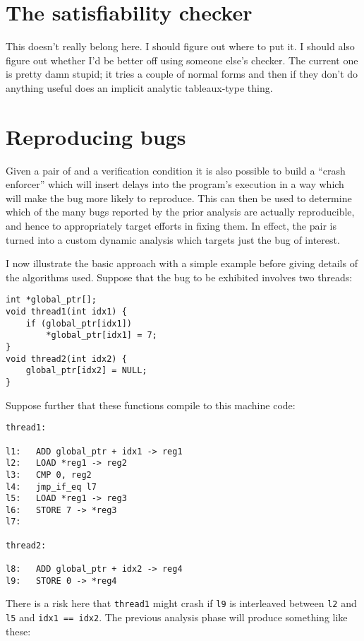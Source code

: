 \section{The satisfiability checker}
This doesn't really belong here.  I should figure out where to put it.
I should also figure out whether I'd be better off using someone
else's checker.  The current one is pretty damn stupid; it tries a
couple of normal forms and then if they don't do anything useful does
an implicit analytic tableaux-type thing.

\section{Reproducing bugs}
\label{sect:reproducing_bugs}

Given a pair of {\StateMachines} and a verification condition it is
also possible to build a ``crash enforcer'' which will insert delays
into the program's execution in a way which will make the bug more
likely to reproduce.  This can then be used to determine which of the
many bugs reported by the prior analysis are actually reproducible,
and hence to appropriately target efforts in fixing them.  In effect,
the {\StateMachine} pair is turned into a custom dynamic analysis
which targets just the bug of interest.

I now illustrate the basic approach with a simple example before
giving details of the algorithms used.  Suppose that the bug to be
exhibited involves two threads:

\begin{verbatim}
int *global_ptr[];
void thread1(int idx1) {
    if (global_ptr[idx1])
        *global_ptr[idx1] = 7;
} 
void thread2(int idx2) {
    global_ptr[idx2] = NULL;
}
\end{verbatim}

Suppose further that these functions compile to this machine code:

\begin{verbatim}
thread1:

l1:   ADD global_ptr + idx1 -> reg1
l2:   LOAD *reg1 -> reg2
l3:   CMP 0, reg2
l4:   jmp_if_eq l7
l5:   LOAD *reg1 -> reg3
l6:   STORE 7 -> *reg3
l7:

thread2:

l8:   ADD global_ptr + idx2 -> reg4
l9:   STORE 0 -> *reg4
\end{verbatim}

There is a risk here that \verb|thread1| might crash if \verb|l9| is
interleaved between \verb|l2| and \verb|l5| and \verb|idx1 == idx2|.
The previous analysis phase will produce \StateMachines something like
these:

